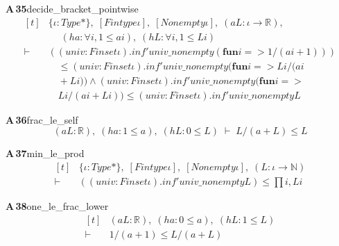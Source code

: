 \documentclass[conference]{IEEEtran}
\theoremstyle{definition}
\newcommand{\lean}[1]{\textsf{\footnotesize #1}}
\begin{document}
\noindent\textbf{A\,35}\quad\lean{decide\_bracket\_pointwise}
{\footnotesize\[ \begin{aligned}[t]
&\{ \iota : \mathit{Type}*\},\; [\mathit{Fintype} \iota ],\; [\mathit{Nonempty} \iota ],\; (\mathit{a} \mathit{L} : \iota \to \mathbb{R} ),\\
&\quad \; (\mathit{ha} : \forall \mathit{i}, 1 \leq \mathit{a} \mathit{i}),\; (\mathit{hL} : \forall \mathit{i}, 1 \leq \mathit{L} \mathit{i})\\
\vdash\;&((\mathit{univ} : \mathit{Finset} \iota ).\mathit{inf'} \mathit{univ\_nonempty} (\mathbf{fun} \mathit{i} => 1/(\mathit{a} \mathit{i} + 1)))\\
&\quad \leq (\mathit{univ} : \mathit{Finset} \iota ).\mathit{inf'} \mathit{univ\_nonempty} (\mathbf{fun} \mathit{i} => \mathit{L} \mathit{i}/(\mathit{a} \mathit{i}\\
&\quad + \mathit{L} \mathit{i})) \wedge (\mathit{univ} : \mathit{Finset} \iota ).\mathit{inf'} \mathit{univ\_nonempty} (\mathbf{fun} \mathit{i} =>\\
&\quad \mathit{L} \mathit{i}/(\mathit{a} \mathit{i} + \mathit{L} \mathit{i})) \leq (\mathit{univ} : \mathit{Finset} \iota ).\mathit{inf'} \mathit{univ\_nonempty} \mathit{L}
\end{aligned} \]}

\noindent\textbf{A\,36}\quad\lean{frac\_le\_self}
{\footnotesize\[ (\mathit{a} \mathit{L} : \mathbb{R} ),\; (\mathit{ha} : 1 \leq \mathit{a}),\; (\mathit{hL} : 0 \leq \mathit{L}) \;\vdash\; \mathit{L}/(\mathit{a} + \mathit{L}) \leq \mathit{L} \]}

\noindent\textbf{A\,37}\quad\lean{min\_le\_prod}
{\footnotesize\[ \begin{aligned}[t]
&\{ \iota : \mathit{Type}*\},\; [\mathit{Fintype} \iota ],\; [\mathit{Nonempty} \iota ],\; (\mathit{L} : \iota \to \mathbb{N} )\\
\vdash\;&((\mathit{univ} : \mathit{Finset} \iota ).\mathit{inf'} \mathit{univ\_nonempty} \mathit{L}) \leq \textstyle\prod \mathit{i}, \mathit{L} \mathit{i}
\end{aligned} \]}

\noindent\textbf{A\,38}\quad\lean{one\_le\_frac\_lower}
{\footnotesize\[ \begin{aligned}[t]
&(\mathit{a} \mathit{L} : \mathbb{R} ),\; (\mathit{ha} : 0 \leq \mathit{a}),\; (\mathit{hL} : 1 \leq \mathit{L})\\
\vdash\;&1/(\mathit{a} + 1) \leq \mathit{L}/(\mathit{a} + \mathit{L})
\end{aligned} \]}
\end{document}
